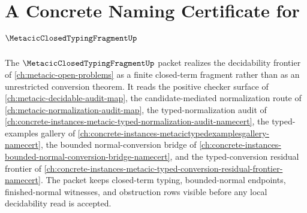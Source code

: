 \chapter{A Concrete Naming Certificate for $\MetacicClosedTypingFragmentUp$}
\label{ch:concrete-instances-metacic-closed-typing-fragment-namecert}

The $\MetacicClosedTypingFragmentUp$ packet realizes the decidability frontier of \autoref{ch:metacic-open-problems} as a finite closed-term fragment rather than as an unrestricted conversion theorem. It reads the positive checker surface of \autoref{ch:metacic-decidable-audit-map}, the candidate-mediated normalization route of \autoref{ch:metacic-normalization-audit-map}, the typed-normalization audit of \autoref{ch:concrete-instances-metacic-typed-normalization-audit-namecert}, the typed-examples gallery of \autoref{ch:concrete-instances-metacictypedexamplesgallery-namecert}, the bounded normal-conversion bridge of \autoref{ch:concrete-instances-bounded-normal-conversion-bridge-namecert}, and the typed-conversion residual frontier of \autoref{ch:concrete-instances-metacic-typed-conversion-residual-frontier-namecert}. The packet keeps closed-term typing, bounded-normal endpoints, finished-normal witnesses, and obstruction rows visible before any local decidability read is accepted.

